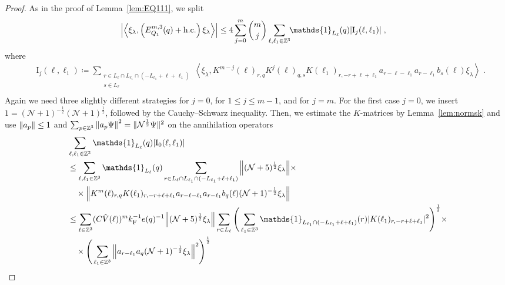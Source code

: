 \documentclass[12pt,a4paper]{article}
\numberwithin{equation}{section}
\newcommand{\cN}{\mathcal{N}}
\newcommand{\1}{\mathbb{I}}
\newcommand{\F}{\mathrm{F}}
\newcommand{\I}{\mathrm{I}}
\newcommand{\Zstar}{\mathbb{Z}^3} %
\newcommand{\Z}{\mathbb{Z}}
\newcommand{\NN}{\mathcal{N}}
\newcommand{\half}{\frac{1}{2}}
\newcommand{\eva}[1]{\left\langle #1 \right\rangle}
\theoremstyle{plain}
\theoremstyle{definition}
\theoremstyle{remark}
\theoremstyle{plain}
\theoremstyle{definition}
\theoremstyle{remark}
\begin{document}
\begin{proof}
As in the proof of Lemma~\ref{lem:EQ111}, we split
\begin{equation} \label{eq:EQ1121}
\begin{aligned}
	& \abs{\eva{\xi_\lambda,\left(E^{m,3}_{Q_1}(q) +  \mathrm{h.c.}\right) \xi_\lambda }}
	\le 4 \sum_{j=0}^m {{m}\choose j} \sum_{\ell,\ell_1 \in \Zstar}\!\! \mathds{1}_{L_\ell}(q) |\I_j(\ell, \ell_1)| \;,
	\end{aligned}
\end{equation}
where
\begin{equation}
\begin{aligned}
	& \I_j(\ell, \ell_1)
	\coloneq \sum_{\substack{r\in L_{\ell} \cap L_{\ell_1} \cap (-L_{\ell_1}+\ell+\ell_1)\\ s \in L_{\ell}}}
		\eva{\xi_\lambda, K^{m-j}(\ell)_{r,q} K^{j}(\ell)_{q,s}K(\ell_1)_{r,-r+\ell+\ell_1} a_{r-\ell-\ell_1} a_{r-\ell_1} b_{s}(\ell) \xi_\lambda} \;. \\
\end{aligned}
\end{equation}
Again we need three slightly different strategies for $ j = 0 $, for $ 1 \le j \le m-1 $, and for $ j = m $. For the first case $ j = 0 $, we insert $1 = (\NN+1)^{-\half}(\NN+1)^{\half}$, followed by the Cauchy--Schwarz inequality. Then, we estimate the $ K $-matrices by Lemma~\ref{lem:normsk} and use $ \norm{a_p} \le 1 $ and $ \sum_{p \in \Z^3} \norm{a_p \Psi}^2 = \Vert \cN^\half \Psi \Vert^2 $ on the annihilation operators
\begin{align}
	&\sum_{\ell,\ell_1 \in \Zstar} \mathds{1}_{L_\ell}(q) |\I_0(\ell, \ell_1)| \nonumber\\
	&\leq \sum_{\ell,\ell_1 \in \Zstar} \mathds{1}_{L_\ell}(q) \sum\limits_{\substack{r\in L_{\ell} \cap L_{\ell_1} \cap (-L_{\ell_1}+\ell+\ell_1)}}
		\norm{ (\NN+5)^{\half} \xi_\lambda} \times \nonumber\\
	&\quad \times \norm{ K^m(\ell )_{r,q} K(\ell_1)_{r,-r+\ell+\ell_1} a_{r-\ell-\ell_1} a_{r-\ell_1} b_{q}(\ell) (\NN+1)^{-\half} \xi_\lambda }\nonumber\\
	 &\leq \sum_{\ell \in \Zstar} (C \hat{V}(\ell))^m k_{\F}^{-1} e(q)^{-1}
	 	\norm{ (\NN+5)^{\half} \xi_\lambda}
	 	\sum_{r \in L_\ell} \Bigg( \sum_{\ell_1 \in \Zstar} \mathds{1}_{L_{\ell_1} \cap (-L_{\ell_1}+\ell+\ell_1)}(r) |K(\ell_1)_{r,-r+\ell+\ell_1}|^2 \Bigg)^{\half} \times \nonumber\\
	 &\quad \times \Bigg( \sum\limits_{\ell_1 \in \Z^3} \norm{ a_{r-\ell_1} a_q (\NN+1)^{-\half} \xi_\lambda }^2 \Bigg)^\half \nonumber\\

\end{align}
\end{proof}
\end{document}
